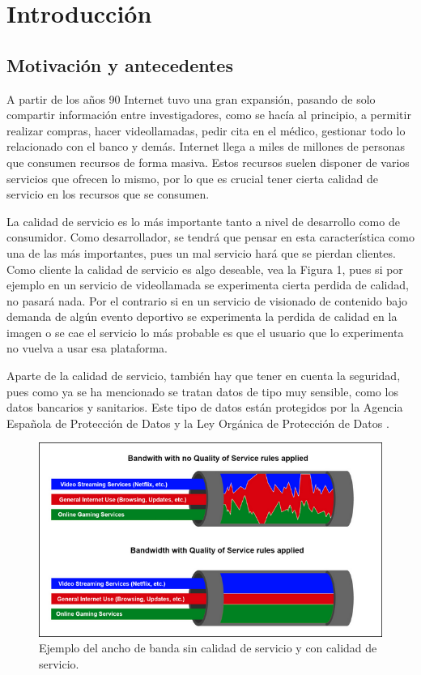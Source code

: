 \chapter{Introducción}

\section{Motivación y antecedentes}

A partir de los años 90 Internet tuvo una gran expansión, pasando de solo compartir información entre investigadores, 
como se hacía al principio, a permitir realizar compras, hacer videollamadas, pedir cita en el médico, gestionar 
todo lo relacionado con el banco y demás. Internet llega a miles de millones de personas que consumen recursos de forma masiva. 
Estos recursos suelen disponer de varios servicios que ofrecen lo mismo, por lo que es crucial tener cierta calidad de servicio 
\cite{microqos} en los recursos que se consumen.

\intro La calidad de servicio es lo más importante tanto a nivel de desarrollo como de consumidor. Como desarrollador, 
se tendrá que pensar en esta característica como una de las más importantes, pues un mal servicio hará que se pierdan 
clientes. Como cliente la calidad de servicio es algo deseable, vea la Figura 1, pues si por ejemplo en un servicio de videollamada se 
experimenta cierta perdida de calidad, no pasará nada. Por el contrario si en un servicio de visionado de contenido 
bajo demanda de algún evento deportivo se experimenta la perdida de calidad en la imagen o se cae el servicio lo más 
probable es que el usuario que lo experimenta no vuelva a usar esa plataforma. \cite{redes2010a}

\intro Aparte de la calidad de servicio, también hay que tener en cuenta la seguridad, pues como ya se ha mencionado 
se tratan datos de tipo muy sensible, como los datos bancarios y sanitarios. Este tipo de datos están protegidos por la Agencia 
Española de Protección de Datos \cite{aepdindex} y la Ley Orgánica de Protección de Datos \cite{lopdindex}.

\begin{figure}[H]
  \includegraphics[width=1\textwidth]{imagenes/calidadservicio.png} 
  \centering
  \caption{Ejemplo del ancho de banda sin calidad de servicio y con calidad de servicio.}
\end{figure}

